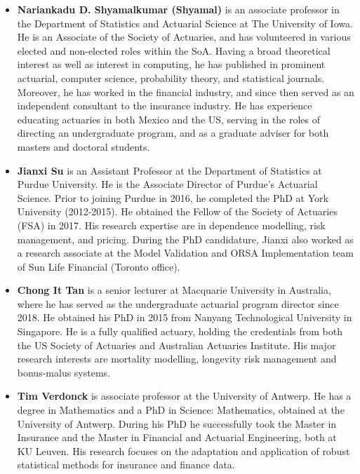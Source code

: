 \documentclass[
]{book}
\providecommand{\tightlist}{%
  \setlength{\itemsep}{0pt}\setlength{\parskip}{0pt}}
\begin{document}
\begin{itemize}
\tightlist
\item
  \textbf{Nariankadu D. Shyamalkumar (Shyamal)} is an associate professor in the Department of Statistics and Actuarial Science at The University of Iowa. He is an Associate of the Society of Actuaries, and has volunteered in various elected and non-elected roles within the SoA. Having a broad theoretical interest as well as interest in computing, he has published in prominent actuarial, computer science, probability theory, and statistical journals. Moreover, he has worked in the financial industry, and since then served as an independent consultant to the insurance industry. He has experience educating actuaries in both Mexico and the US, serving in the roles of directing an undergraduate program, and as a graduate adviser for both masters and doctoral students.
\end{itemize}

\begin{itemize}
\tightlist
\item
  \textbf{Jianxi Su} is an Assistant Professor at the Department of Statistics at Purdue University. He is the Associate Director of Purdue's Actuarial Science. Prior to joining Purdue in 2016, he completed the PhD at York University (2012-2015). He obtained the Fellow of the Society of Actuaries (FSA) in 2017. His research expertise are in dependence modelling, risk management, and pricing. During the PhD candidature, Jianxi also worked as a research associate at the Model Validation and ORSA Implementation team of Sun Life Financial (Toronto office).
\end{itemize}

\begin{itemize}
\tightlist
\item
  \textbf{Chong It Tan} is a senior lecturer at Macquarie University in Australia, where he has served as the undergraduate actuarial program director since 2018. He obtained his PhD in 2015 from Nanyang Technological University in Singapore. He is a fully qualified actuary, holding the credentials from both the US Society of Actuaries and Australian Actuaries Institute. His major research interests are mortality modelling, longevity risk management and bonus-malus systems.
\end{itemize}

\begin{itemize}
\tightlist
\item
  \textbf{Tim Verdonck} is associate professor at the University of Antwerp. He has a degree in Mathematics and a PhD in Science: Mathematics, obtained at the University of Antwerp. During his PhD he successfully took the Master in Insurance and the Master in Financial and Actuarial Engineering, both at KU Leuven. His research focuses on the adaptation and application of robust statistical methods for insurance and finance data.
\end{itemize}
\end{document}
